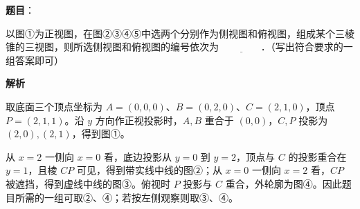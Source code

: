 \begin{answer}

\textbf{题目}：

以图①为正视图，在图②③④⑤中选两个分别作为侧视图和俯视图，组成某个三棱锥的三视图，则所选侧视图和俯视图的编号依次为 $\underline{\qquad\qquad}$．（写出符合要求的一组答案即可）
\nopagebreak[4]
\begin{center}\end{center}
\nopagebreak[4]
\textbf{解析}

取底面三个顶点坐标为 $A=(0,0,0)$、$B=(0,2,0)$、$C=(2,1,0)$，顶点 $P=(2,1,1)$。沿 $y$ 方向作正视投影时，$A,B$ 重合于 $(0,0)$，$C,P$ 投影为 $(2,0),(2,1)$，得到图①。

从 $x=2$ 一侧向 $x=0$ 看，底边投影从 $y=0$ 到 $y=2$，顶点与 $C$ 的投影重合在 $y=1$，且棱 $CP$ 可见，得到带实线中线的图②；从 $x=0$ 一侧向 $x=2$ 看，$CP$ 被遮挡，得到虚线中线的图③。俯视时 $P$ 投影与 $C$ 重合，外轮廓为图④。因此题目所需的一组可取②、④；若按左侧观察则取③、④。


\par\medskip

\end{answer}

